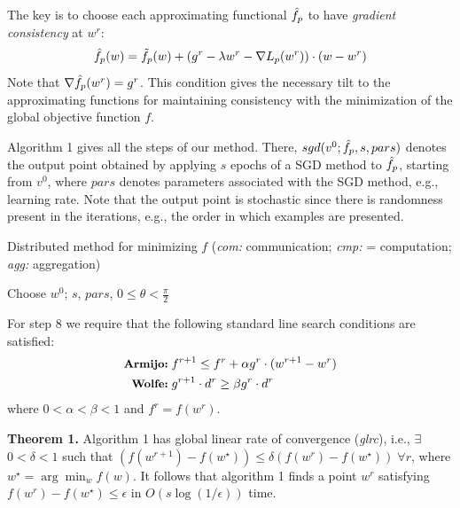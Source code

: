 \documentclass{article} %
\begin{document}
The key is to choose each approximating functional $\hat{f}_p$ to have {\it gradient consistency} at $w^r$:
\begin{equation}
\hat{f}_p(w) = \tilde{f}_p(w) + (g^r - \lambda w^r-\nabla L_p(w^r))\cdot(w-w^r)
\label{riskapp}
\end{equation}
Note that $\nabla\hat{f}_p(w^r)=g^r$. This condition gives the necessary tilt to the approximating functions for maintaining consistency with the minimization of the global objective function $f$.

Algorithm 1 gives all the steps of our method. There, $sgd(v^0;\hat{f}_p,s,pars)$ denotes the output point obtained by applying $s$ epochs of a SGD method to $\hat{f}_p$, starting from $v^0$, where $pars$ denotes parameters associated with the SGD method, e.g., learning rate. Note that the output point is stochastic since there is randomness present in the iterations, e.g., the order in which examples are presented.

\begin{algorithm2e}
\caption{Distributed method for minimizing $f$ ({\it com:} communication; {\it cmp:} = computation; {\it agg:} aggregation)}
Choose $w^0$; $s$, $pars$, $0\le\theta < \frac{\pi}{2}$\;
\end{algorithm2e}

For step 8 we require that the following standard line search conditions are satisfied:
\begin{eqnarray}
\mbox{{\small\bf Armijo:}}\; & f^{r+1} \le f^r + \alpha g^r\cdot(w^{r+1}-w^r) \label{ag} \\
\mbox{{\small\bf Wolfe:}}\;  & g^{r+1}\cdot d^r \ge \beta g^r\cdot d^r \label{wolfe}
\end{eqnarray}
where $0<\alpha<\beta<1$ and $f^r=f(w^r)$.

{\bf Theorem 1.} Algorithm 1 has global linear rate of convergence ({\it glrc}), i.e., $\exists$ $0<\delta<1$ such that $(f(w^{r+1})-f(w^\star)) \le \delta (f(w^r)-f(w^\star))\;\forall r$, where $w^\star=\arg\min_w f(w)$. It follows that algorithm 1 finds a point $w^r$ satisfying $f(w^r)-f(w^\star)\le\epsilon$ in $O(s \log(1/\epsilon))$ time.
\end{document}
